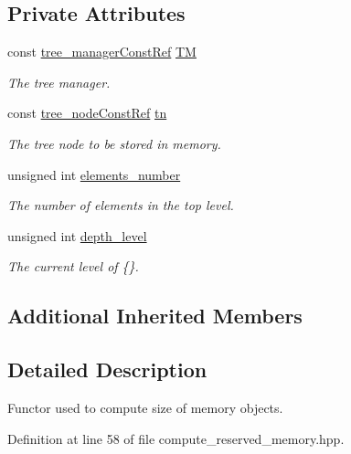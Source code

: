 \subsection*{Private Attributes}
\begin{DoxyCompactItemize}
\item 
const \hyperlink{tree__manager_8hpp_a792e3f1f892d7d997a8d8a4a12e39346}{tree\+\_\+manager\+Const\+Ref} \hyperlink{classComputeReservedMemory_a1de84842d1f10700a780d6aea075fc89}{TM}
\begin{DoxyCompactList}\small\item\em The tree manager. \end{DoxyCompactList}\item 
const \hyperlink{tree__node_8hpp_a3cf5d02292c940f3892425a5b5fdec3c}{tree\+\_\+node\+Const\+Ref} \hyperlink{classComputeReservedMemory_abbd1c91f8c511b663f8a9e5816e70153}{tn}
\begin{DoxyCompactList}\small\item\em The tree node to be stored in memory. \end{DoxyCompactList}\item 
unsigned int \hyperlink{classComputeReservedMemory_a132e4e354537df8362bce88e3cb013f3}{elements\+\_\+number}
\begin{DoxyCompactList}\small\item\em The number of elements in the top level. \end{DoxyCompactList}\item 
unsigned int \hyperlink{classComputeReservedMemory_a563f4a38587b3bf54e733dc0b3866e27}{depth\+\_\+level}
\begin{DoxyCompactList}\small\item\em The current level of \{\}. \end{DoxyCompactList}\end{DoxyCompactItemize}
\subsection*{Additional Inherited Members}


\subsection{Detailed Description}
Functor used to compute size of memory objects. 

Definition at line 58 of file compute\+\_\+reserved\+\_\+memory.\+hpp.




